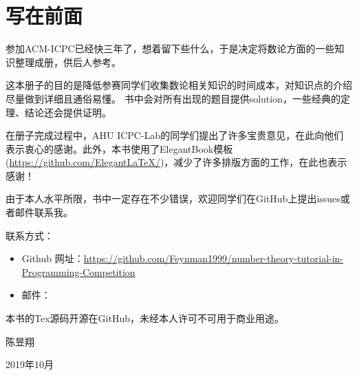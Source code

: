 \chapter*{写在前面}
	参加ACM-ICPC已经快三年了，想着留下些什么，于是决定将数论方面的一些知识整理成册，供后人参考。
	
	这本册子的目的是{\heiti 降低参赛同学们收集数论相关知识的时间成本}，对知识点的介绍尽量做到详细且通俗易懂。
	书中会对所有出现的题目提供solution，一些经典的定理、结论还会提供证明。
	
	在册子完成过程中，AHU ICPC-Lab的同学们提出了许多宝贵意见，在此向他们表示衷心的感谢。此外，本书使用了ElegantBook模板
	(\href{https://github.com/ElegantLaTeX/}{https://github.com/ElegantLaTeX/})，减少了许多排版方面的工作，在此也表示感谢！
		
	由于本人水平所限，书中一定存在不少错误，欢迎同学们在GitHub上提出issues或者邮件联系我。\\
	
	\vbox{}
	

联系方式：
	\begin{itemize}
		\item Github 网址：\href{https://github.com/Feynman1999/number-theory-tutorial-in-Programming-Competition}{https://github.com/Feynman1999/number-theory-tutorial-in-Programming-Competition}
		\item 邮件：
	\end{itemize}

\vbox{}

本书的Tex源码开源在GitHub，未经本人许可不可用于商业用途。\\

\vbox{}

\begin{flushright}
陈昱翔

2019年10月
\end{flushright}
	